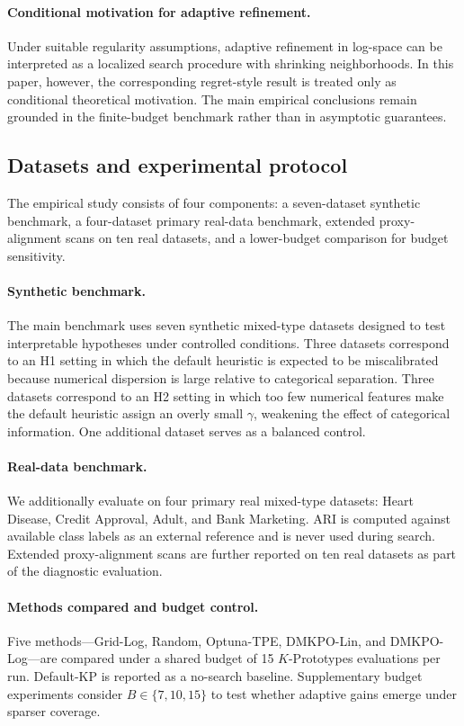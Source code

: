\documentclass[10pt,lineno]{wlpeerj}
\begin{document}
\paragraph{Conditional motivation for adaptive refinement.}
Under suitable regularity assumptions, adaptive refinement in log-space can be interpreted as a localized search procedure with shrinking neighborhoods. In this paper, however, the corresponding regret-style result is treated only as conditional theoretical motivation. The main empirical conclusions remain grounded in the finite-budget benchmark rather than in asymptotic guarantees.

\subsection*{Datasets and experimental protocol}

The empirical study consists of four components: a seven-dataset synthetic benchmark, a four-dataset primary real-data benchmark, extended proxy-alignment scans on ten real datasets, and a lower-budget comparison for budget sensitivity.

\paragraph{Synthetic benchmark.}
The main benchmark uses seven synthetic mixed-type datasets designed to test interpretable hypotheses under controlled conditions. Three datasets correspond to an H1 setting in which the default heuristic is expected to be miscalibrated because numerical dispersion is large relative to categorical separation. Three datasets correspond to an H2 setting in which too few numerical features make the default heuristic assign an overly small $\gamma$, weakening the effect of categorical information. One additional dataset serves as a balanced control.

\paragraph{Real-data benchmark.}
We additionally evaluate on four primary real mixed-type datasets: Heart Disease, Credit Approval, Adult, and Bank Marketing. ARI is computed against available class labels as an external reference and is never used during search. Extended proxy-alignment scans are further reported on ten real datasets as part of the diagnostic evaluation.

\paragraph{Methods compared and budget control.}
Five methods---Grid-Log, Random, Optuna-TPE, DMKPO-Lin, and DMKPO-Log---are compared under a shared budget of 15 $K$-Prototypes evaluations per run. Default-KP is reported as a no-search baseline. Supplementary budget experiments consider $B \in \{7,10,15\}$ to test whether adaptive gains emerge under sparser coverage.
\end{document}
